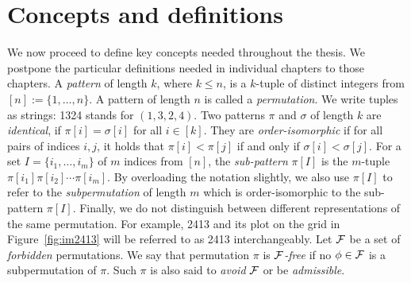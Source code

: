 \documentclass[12pt, a4paper, twoside]{report}
\begin{document}
\section{Concepts and definitions}
We now proceed to define key concepts needed throughout the thesis. We postpone the particular definitions needed in individual chapters to those chapters. A \emph{pattern} of length $k$, where $k \leq n$, is a $k$-tuple of distinct integers from $[n] :=\{1,\ldots,n\}$. A pattern of length $n$ is called a \emph{permutation}. We write tuples as strings: 1324 stands for $(1,3,2,4)$. Two patterns $\pi$ and $\sigma$ of length $k$ are \emph{identical}, if $\pi[i] = \sigma[i]$ for all $i \in [k]$. They are \emph{order-isomorphic} if for all pairs of indices $i,j$, it holds that $\pi[i] <\pi[j]$ if and only if $\sigma[i] < \sigma[j]$. For a set $I = \{i_1,\ldots,i_m\}$ of $m$ indices from $[n]$, the \emph{sub-pattern} $\pi[I]$ is the $m$-tuple $\pi[i_1]\pi[i_2]\cdots \pi[i_m]$. By overloading the notation slightly, we also use $\pi[I]$ to refer to the \emph{subpermutation} of length $m$ which is order-isomorphic to the sub-pattern $\pi[I]$. Finally, we do not distinguish between different representations of the same permutation. For example, 2413 and its plot on the grid in Figure~\ref{fig:im2413} will be referred to as 2413 interchangeably. Let $\mathcal{F}$ be a set of \emph{forbidden} permutations. We say that permutation $\pi$ is \emph{$\mathcal{F}$-free} if no $\phi\in\mathcal{F}$ is a subpermutation of $\pi$. Such $\pi$ is also said to \emph{avoid} $\mathcal{F}$ or be \emph{admissible}. 
\end{document}
